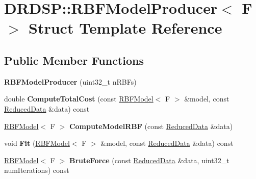 \hypertarget{struct_d_r_d_s_p_1_1_r_b_f_model_producer}{\section{D\-R\-D\-S\-P\-:\-:R\-B\-F\-Model\-Producer$<$ F $>$ Struct Template Reference}
\label{struct_d_r_d_s_p_1_1_r_b_f_model_producer}
}
\subsection*{Public Member Functions}
\begin{DoxyCompactItemize}
\item 
\hypertarget{struct_d_r_d_s_p_1_1_r_b_f_model_producer_a5f6458adc3a8e305a9328def6a01dc90}{{\bfseries R\-B\-F\-Model\-Producer} (uint32\-\_\-t n\-R\-B\-Fs)}\label{struct_d_r_d_s_p_1_1_r_b_f_model_producer_a5f6458adc3a8e305a9328def6a01dc90}

\item 
\hypertarget{struct_d_r_d_s_p_1_1_r_b_f_model_producer_a16cb611f76aa0dd48ee10371e9cbd1eb}{double {\bfseries Compute\-Total\-Cost} (const \hyperlink{struct_d_r_d_s_p_1_1_r_b_f_model}{R\-B\-F\-Model}$<$ F $>$ \&model, const \hyperlink{struct_d_r_d_s_p_1_1_reduced_data}{Reduced\-Data} \&data) const }\label{struct_d_r_d_s_p_1_1_r_b_f_model_producer_a16cb611f76aa0dd48ee10371e9cbd1eb}

\item 
\hypertarget{struct_d_r_d_s_p_1_1_r_b_f_model_producer_a303c50b6123fe517f5c533bd91c78ec1}{\hyperlink{struct_d_r_d_s_p_1_1_r_b_f_model}{R\-B\-F\-Model}$<$ F $>$ {\bfseries Compute\-Model\-R\-B\-F} (const \hyperlink{struct_d_r_d_s_p_1_1_reduced_data}{Reduced\-Data} \&data)}\label{struct_d_r_d_s_p_1_1_r_b_f_model_producer_a303c50b6123fe517f5c533bd91c78ec1}

\item 
\hypertarget{struct_d_r_d_s_p_1_1_r_b_f_model_producer_a32723b0083d4ab3fe89d66fb7ee2d371}{void {\bfseries Fit} (\hyperlink{struct_d_r_d_s_p_1_1_r_b_f_model}{R\-B\-F\-Model}$<$ F $>$ \&model, const \hyperlink{struct_d_r_d_s_p_1_1_reduced_data}{Reduced\-Data} \&data) const }\label{struct_d_r_d_s_p_1_1_r_b_f_model_producer_a32723b0083d4ab3fe89d66fb7ee2d371}

\item 
\hypertarget{struct_d_r_d_s_p_1_1_r_b_f_model_producer_a6e61d59956aa01e34786da6d8971c9bd}{\hyperlink{struct_d_r_d_s_p_1_1_r_b_f_model}{R\-B\-F\-Model}$<$ F $>$ {\bfseries Brute\-Force} (const \hyperlink{struct_d_r_d_s_p_1_1_reduced_data}{Reduced\-Data} \&data, uint32\-\_\-t num\-Iterations) const }\label{struct_d_r_d_s_p_1_1_r_b_f_model_producer_a6e61d59956aa01e34786da6d8971c9bd}

\end{DoxyCompactItemize}
